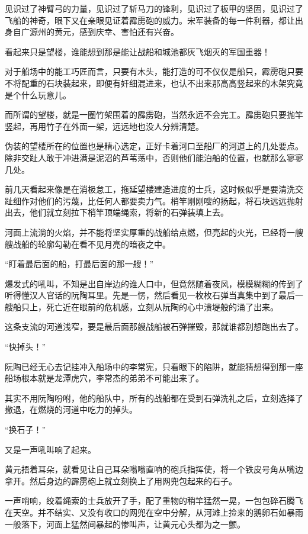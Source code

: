 见识过了神臂弓的力量，见识过了斩马刀的锋利，见识过了板甲的坚固，见识过了飞船的神奇，眼下又在亲眼见证着霹雳砲的威力。宋军装备的每一件利器，都让出身自广源州的黄元，感到庆幸、害怕还有兴奋。

看起来只是望楼，谁能想到那是能让战船和城池都灰飞烟灭的军国重器！

对于船场中的能工巧匠而言，只要有木头，能打造的可不仅仅是船只，霹雳砲只要不将配重的石块装起来，即便有奸细混进来，也认不出来那高高竖起来的木架究竟是个什么玩意儿。

而所谓的望楼，就是一圈竹架围着的霹雳砲，当然永远不会完工。霹雳砲只要抛竿竖起，再用竹子在外面一架，远远地也没人分辨清楚。

伪装的望楼所在的位置也是精心选定，正好卡着河口至船厂的河道上的几处要点。除非交趾人敢于冲进满是泥沼的芦苇荡中，否则他们能泊船的位置，也就那么寥寥几处。

前几天看起来像是在消极怠工，拖延望楼建造进度的士兵，这时候似乎是要清洗交趾细作对他们的污蔑，比任何人都要卖力气。梢竿刚刚嗖的扬起，将石块远远抛射出去，他们就立刻拉下梢竿顶端绳索，将新的石弹装填上去。

河面上流淌的火焰，并不能将坚实厚重的战船给点燃，但亮起的火光，已经将一艘艘战船的轮廓勾勒在看不见月亮的暗夜之中。

“盯着最后面的船，打最后面的那一艘！”

爆发式的吼叫，不知是出自岸边的谁人口中，但竟然随着夜风，模模糊糊的传到了听得懂汉人官话的阮陶耳里。先是一愣，然后看见一枚枚石弹当真集中到了最后一艘船只上，死亡近在眼前的危机感，立刻从阮陶的心中溃堤般的涌了出来。

这条支流的河道浅窄，要是最后面那艘战船被石弹摧毁，那就谁都别想跑出去了。

“快掉头！”

阮陶已经无心去记挂冲入船场中的李常宪，只看眼下的陷阱，就能猜想得到那一座船场根本就是龙潭虎穴，李常杰的弟弟不可能出来了。

其实不用阮陶吩咐，他的船队中，所有的战船都在受到石弹洗礼之后，立刻选择了撤退，在燃烧的河道中吃力的掉头。

“换石子！”

又是一声吼叫响了起来。

黄元捂着耳朵，就看见让自己耳朵嗡嗡直响的砲兵指挥使，将一个铁皮号角从嘴边拿开。然后身边的霹雳砲上就立刻换上了用网兜包起来的石子。

一声哨响，绞着绳索的士兵放开了手，配了重物的稍竿猛然一晃，一包包碎石腾飞在天空。并不结实、又没有收口的网兜在空中分解，从河滩上捡来的鹅卵石如暴雨一般落下，河面上猛然间暴起的惨叫声，让黄元心头都为之一颤。

